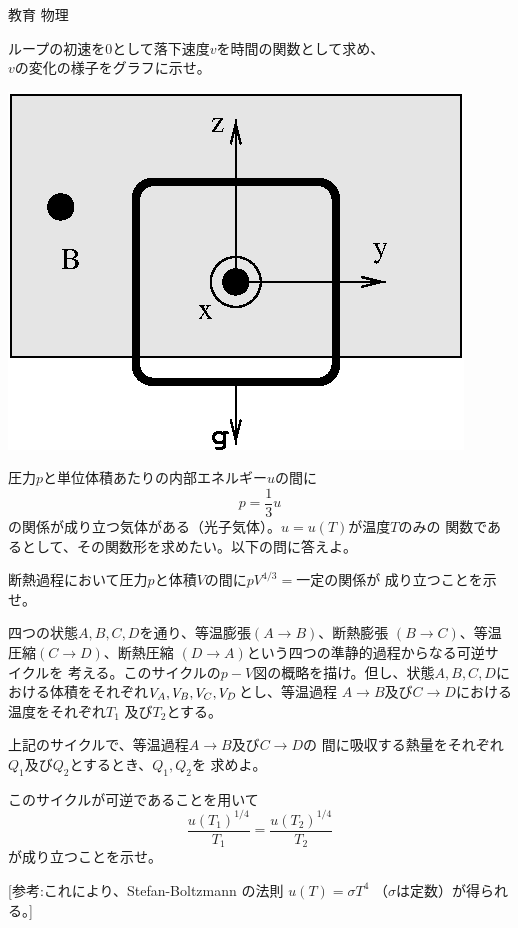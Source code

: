 \documentclass[fleqn]{jbook}
\begin{document}
\begin{question}{教育 物理}{}
\begin{subquestions}
{\begin{subsubquestions}
  \SubSubQuestion
    ループの初速を$0$として落下速度$v$を時間の関数として求め、\\
    $v$の変化の様子をグラフに示せ。
  \end{subsubquestions}
  }\parbox[t]{60mm}{
  \begin{center}
    \mbox{\includegraphics[clip]{1993phys-1.eps}}
  \end{center}}
  \vspace*{-6mm}

\SubQuestion
  圧力$p$と単位体積あたりの内部エネルギー$u$の間に
%
  \[p=\frac{1}{3}u \]
%
  の関係が成り立つ気体がある（光子気体）。$u=u(T)$が温度$T$のみの
  関数であるとして、その関数形を求めたい。以下の問に答えよ。

  \begin{subsubquestions}
  \SubSubQuestion
    断熱過程において圧力$p$と体積$V$の間に$pV^{4/3}=一定$の関係が
    成り立つことを示せ。

  \SubSubQuestion
    四つの状態$A,B,C,D$を通り、等温膨張$(A\rightarrow B)$、断熱膨張
    $(B\rightarrow C)$、等温圧縮$(C\rightarrow D)$、断熱圧縮
    $(D\rightarrow A)$という四つの準静的過程からなる可逆サイクルを
    考える。このサイクルの$p-V$図の概略を描け。但し、状態$A,B,C,D$に
    おける体積をそれぞれ$V_A,V_B,V_C,\\V_D$とし、等温過程
    $A\rightarrow B$及び$C\rightarrow D$における温度をそれぞれ$T_1$
    及び$T_2$とする。

  \SubSubQuestion
    上記のサイクルで、等温過程$A\rightarrow B$及び$C\rightarrow D$の
    間に吸収する熱量をそれぞれ$Q_1$及び$Q_2$とするとき、$Q_1,Q_2$を
    求めよ。

  \SubSubQuestion
    このサイクルが可逆であることを用いて
%
    \[\frac{u(T_1)^{1/4}}{T_1}=\frac{u(T_2)^{1/4}}{T_2} \]
%
    が成り立つことを示せ。

    [参考:これにより、Stefan-Boltzmann の法則 $u(T)=\sigma T^4$
    （$\sigma$は定数）が得られる。]
  \end{subsubquestions}
\end{subquestions}
\end{question}
\end{document}
